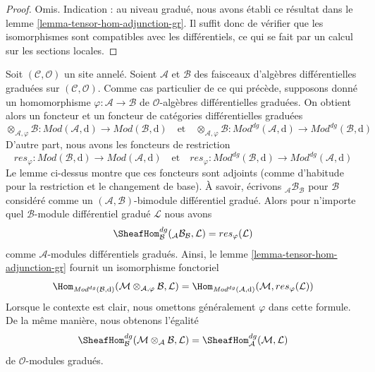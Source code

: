 \begin{proof}
Omis. Indication : au niveau gradué, nous avons établi ce résultat dans le lemme \ref{lemma-tensor-hom-adjunction-gr}.
Il suffit donc de vérifier que les isomorphismes sont compatibles avec les différentiels, ce qui se fait par un calcul sur les sections locales.
\end{proof}

\noindent
Soit $(\mathcal{C}, \mathcal{O})$ un site annelé.
Soient $\mathcal{A}$ et $\mathcal{B}$ des faisceaux d'algèbres différentielles graduées sur $(\mathcal{C}, \mathcal{O})$.
Comme cas particulier de ce qui précède, supposons donné un homomorphisme $\varphi : \mathcal{A} \to \mathcal{B}$ de $\mathcal{O}$-algèbres différentielles graduées.
On obtient alors un foncteur et un foncteur de catégories différentielles graduées
$$
\otimes_{\mathcal{A}, \varphi} \mathcal{B} :
\textit{Mod}(\mathcal{A}, \text{d})
\longrightarrow
\textit{Mod}(\mathcal{B}, \text{d})
\quad\text{et}\quad
\otimes_{\mathcal{A}, \varphi} \mathcal{B} :
\textit{Mod}^{dg}(\mathcal{A}, \text{d})
\longrightarrow
\textit{Mod}^{dg}(\mathcal{B}, \text{d})
$$
D'autre part, nous avons les foncteurs de restriction
$$
res_\varphi :
\textit{Mod}(\mathcal{B}, \text{d})
\longrightarrow
\textit{Mod}(\mathcal{A}, \text{d})
\quad\text{et}\quad
res_\varphi :
\textit{Mod}^{dg}(\mathcal{B}, \text{d})
\longrightarrow
\textit{Mod}^{dg}(\mathcal{A}, \text{d})
$$
Le lemme ci-dessus montre que ces foncteurs sont adjoints (comme d'habitude pour la restriction et le changement de base).
À savoir, écrivons ${}_\mathcal{A}\mathcal{B}_\mathcal{B}$ pour $\mathcal{B}$ considéré comme un $(\mathcal{A}, \mathcal{B})$-bimodule différentiel gradué.
Alors pour n'importe quel $\mathcal{B}$-module différentiel gradué $\mathcal{L}$ nous avons
$$
\SheafHom_\mathcal{B}^{dg}({}_\mathcal{A}\mathcal{B}_\mathcal{B}, \mathcal{L})
= res_\varphi(\mathcal{L})
$$
comme $\mathcal{A}$-modules différentiels gradués.
Ainsi, le lemme \ref{lemma-tensor-hom-adjunction-gr} fournit un isomorphisme fonctoriel
$$
\Hom_{\textit{Mod}^{dg}(\mathcal{B}, \text{d})}(
\mathcal{M} \otimes_{\mathcal{A}, \varphi} \mathcal{B}, \mathcal{L}) =
\Hom_{\textit{Mod}^{dg}(\mathcal{A}, \text{d})}(
\mathcal{M}, res_\varphi(\mathcal{L}))
$$
Lorsque le contexte est clair, nous omettons généralement $\varphi$ dans cette formule.
De la même manière, nous obtenons l'égalité
$$
\SheafHom^{dg}_\mathcal{B}(
\mathcal{M} \otimes_\mathcal{A} \mathcal{B}, \mathcal{L}) =
\SheafHom_\mathcal{A}^{dg}(\mathcal{M}, \mathcal{L})
$$
de $\mathcal{O}$-modules gradués.












